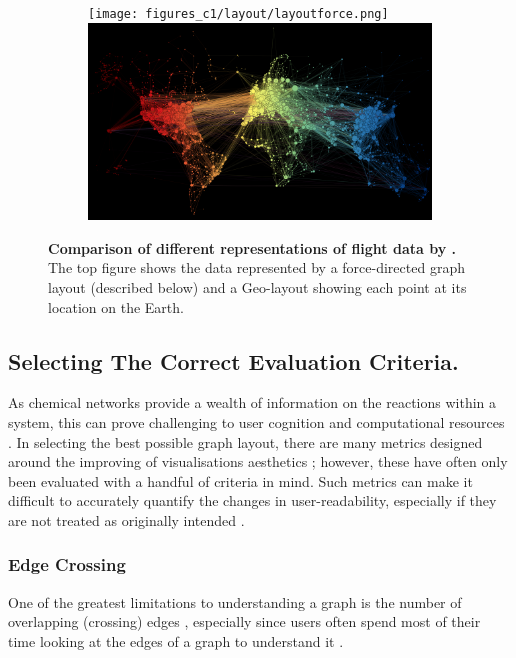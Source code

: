 \begin{figure}[H]
     \centering
      \begin{subfigure}[b,black]{.9\textwidth}
         \centering
     \texttt{[image: figures\_c1/layout/layoutforce.png]}
     \includegraphics[width=\textwidth]{figures_c1/layout/layoutgeo.png}
     \end{subfigure}
        \caption{\textbf{Comparison of different representations of flight data by \citep{worldmap}.} The top figure shows the data represented by a force-directed graph layout (described below) and a Geo-layout showing each point at its location on the Earth.}
        \label{fig:worldmap}
\end{figure}


\subsection{Selecting The Correct Evaluation Criteria.}
As chemical networks provide a wealth of information on the reactions within a system, this can prove challenging to user cognition and computational resources \citep{ch1}. In selecting the best possible graph layout, there are many metrics designed around the improving of visualisations aesthetics \citep{metricgraphaesthetics}; however, these have often only been evaluated with a handful of criteria in mind. Such metrics can make it difficult to accurately quantify the changes in user-readability, especially if they are not treated as originally intended \citep{eyetrack}.


\subsubsection{Edge Crossing} \label{sec:edgecross}
One of the greatest limitations to understanding a graph is the number of overlapping (crossing) edges \citep{humanaesthetic}, especially since users often spend most of their time looking at the edges of a graph to understand it \citep{eyetrack}.

